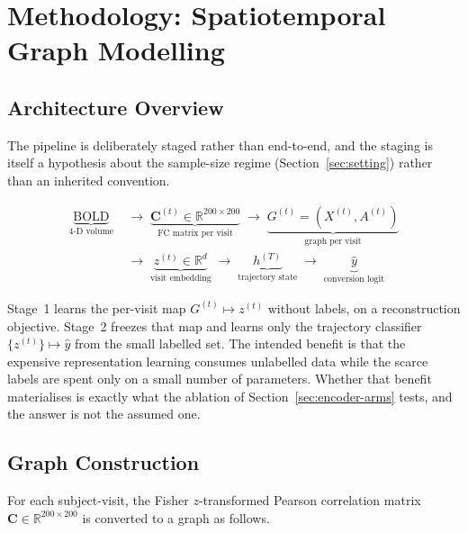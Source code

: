 \chapter{Methodology: Spatiotemporal Graph Modelling}
\label{ch:methodology}

\section{Architecture Overview}
\label{sec:architecture}

The pipeline is deliberately staged rather than end-to-end, and the staging is itself a
hypothesis about the sample-size regime (Section~\ref{sec:setting}) rather than an
inherited convention.

\begin{align*}
  \underbrace{\text{BOLD}}_{\text{4-D volume}}
  \;&\longrightarrow\;
  \underbrace{\mathbf{C}^{(t)} \in \mathbb{R}^{200\times200}}_{\text{FC matrix per visit}}
  \;\longrightarrow\;
  \underbrace{G^{(t)} = (X^{(t)}, A^{(t)})}_{\text{graph per visit}} \\[0.4em]
  \;&\longrightarrow\;
  \underbrace{z^{(t)} \in \mathbb{R}^{d}}_{\text{visit embedding}}
  \;\longrightarrow\;
  \underbrace{h^{(T)}}_{\text{trajectory state}}
  \;\longrightarrow\;
  \underbrace{\hat{y}}_{\text{conversion logit}}
\end{align*}

Stage~1 learns the per-visit map $G^{(t)} \mapsto z^{(t)}$ without labels, on a
reconstruction objective. Stage~2 freezes that map and learns only the trajectory
classifier $\{z^{(t)}\} \mapsto \hat{y}$ from the small labelled set. The intended benefit
is that the expensive representation learning consumes unlabelled data while the scarce
labels are spent only on a small number of parameters. Whether that benefit materialises is
exactly what the ablation of Section~\ref{sec:encoder-arms} tests, and the answer is not
the assumed one.

\section{Graph Construction}
\label{sec:graph-construction}

For each subject-visit, the Fisher $z$-transformed Pearson correlation matrix
$\mathbf{C} \in \mathbb{R}^{200\times200}$ is converted to a graph as follows.

